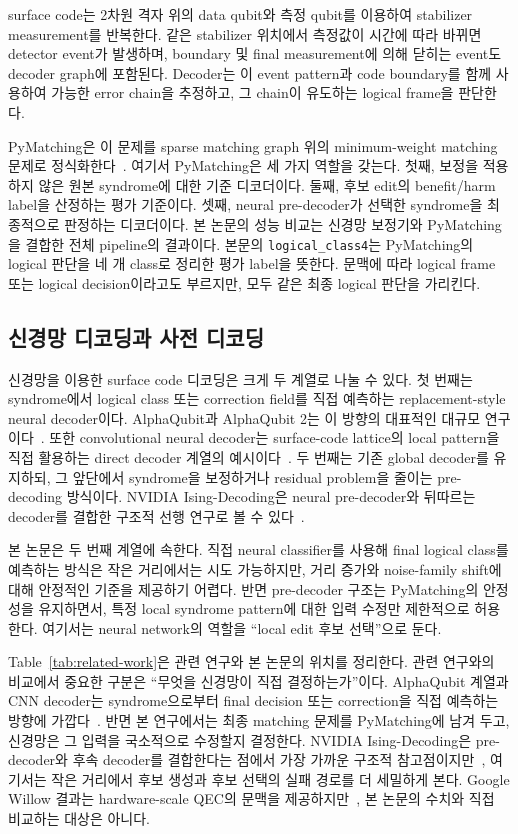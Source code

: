\documentclass[aps,prd,12pt,twocolumn,superscriptaddress,floatfix,longbibliography]{revtex4-2}
\begin{document}
surface code는 2차원 격자 위의 data qubit와 측정 qubit를 이용하여 stabilizer
measurement를 반복한다. 같은 stabilizer 위치에서 측정값이 시간에 따라 바뀌면
detector event가 발생하며, boundary 및 final measurement에 의해 닫히는 event도
decoder graph에 포함된다. Decoder는 이 event pattern과 code boundary를 함께
사용하여 가능한 error chain을 추정하고, 그 chain이 유도하는 logical frame을
판단한다.

PyMatching은 이 문제를 sparse matching graph 위의 minimum-weight matching 문제로
정식화한다~\cite{pymatching}. 여기서 PyMatching은 세 가지 역할을 갖는다.
첫째, 보정을 적용하지 않은 원본 syndrome에 대한 기준 디코더이다. 둘째, 후보
edit의 benefit/harm label을 산정하는 평가 기준이다. 셋째, neural pre-decoder가
선택한 syndrome을 최종적으로 판정하는 디코더이다. 본 논문의 성능 비교는 신경망
보정기와 PyMatching을 결합한 전체 pipeline의 결과이다.
본문의 \texttt{logical\_class4}는 PyMatching의 logical 판단을 네 개 class로 정리한
평가 label을 뜻한다. 문맥에 따라 logical frame 또는 logical decision이라고도
부르지만, 모두 같은 최종 logical 판단을 가리킨다.

\subsection{신경망 디코딩과 사전 디코딩}

신경망을 이용한 surface code 디코딩은 크게 두 계열로 나눌 수 있다. 첫 번째는
syndrome에서 logical class 또는 correction field를 직접 예측하는 replacement-style
neural decoder이다. AlphaQubit과 AlphaQubit 2는 이 방향의 대표적인 대규모
연구이다~\cite{alphaqubit,alphaqubit2}. 또한 convolutional neural decoder는
surface-code lattice의 local pattern을 직접 활용하는 direct decoder 계열의
예시이다~\cite{convnnsurface}. 두 번째는 기존 global decoder를 유지하되, 그
앞단에서 syndrome을 보정하거나 residual problem을 줄이는 pre-decoding 방식이다.
NVIDIA Ising-Decoding은 neural pre-decoder와 뒤따르는 decoder를 결합한 구조적
선행 연구로 볼 수 있다~\cite{nvidiaising}.

본 논문은 두 번째 계열에 속한다. 직접 neural classifier를 사용해 final
logical class를 예측하는 방식은 작은 거리에서는 시도 가능하지만, 거리 증가와
noise-family shift에 대해 안정적인 기준을 제공하기 어렵다. 반면 pre-decoder
구조는 PyMatching의 안정성을 유지하면서, 특정 local syndrome pattern에 대한
입력 수정만 제한적으로 허용한다. 여기서는 neural network의 역할을
``local edit 후보 선택''으로 둔다.

Table~\ref{tab:related-work}은 관련 연구와 본 논문의 위치를 정리한다.
관련 연구와의 비교에서 중요한 구분은 ``무엇을 신경망이 직접 결정하는가''이다.
AlphaQubit 계열과 CNN decoder는 syndrome으로부터 final decision 또는 correction을
직접 예측하는 방향에 가깝다~\cite{alphaqubit,alphaqubit2,convnnsurface}. 반면 본
연구에서는 최종 matching 문제를 PyMatching에 남겨 두고, 신경망은 그 입력을
국소적으로 수정할지 결정한다. NVIDIA Ising-Decoding은 pre-decoder와 후속 decoder를
결합한다는 점에서 가장 가까운 구조적 참고점이지만~\cite{nvidiaising}, 여기서는
작은 거리에서 후보 생성과 후보 선택의 실패 경로를 더 세밀하게 본다. Google Willow
결과는 hardware-scale QEC의 문맥을 제공하지만~\cite{willowthreshold}, 본 논문의
수치와 직접 비교하는 대상은 아니다.
\end{document}
